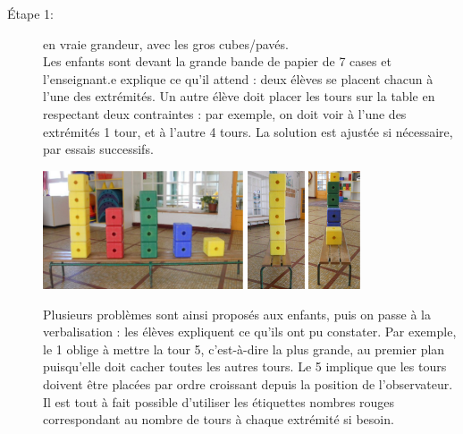 \begin{exercice*}
\begin{description}
   \item[Étape 1:] en vraie grandeur, avec les gros cubes/pavés. \\
   Les enfants sont devant la grande bande de papier de 7 cases et l’enseignant.e explique ce qu’il attend : deux élèves se placent chacun à l'une des extrémités. Un autre élève doit placer les tours sur la table en respectant deux contraintes : par exemple, on doit voir à l'une des extrémités 1 tour, et à l'autre 4 tours. La solution est ajustée si nécessaire, par essais successifs. \smallskip
   \begin{center}
      \includegraphics[height=3.5cm]{Geometrie_did/Images/Geo6_activites_tours3} \qquad \includegraphics[height=3.5cm]{Geometrie_did/Images/Geo6_activites_tours5} \qquad \includegraphics[height=3.5cm]{Geometrie_did/Images/Geo6_activites_tours4}
   \end{center}
   Plusieurs problèmes sont ainsi proposés aux enfants, puis on passe à la verbalisation : les élèves expliquent ce qu'ils ont pu constater. Par exemple, le 1 oblige à mettre la tour 5, c’est-à-dire la plus grande, au premier plan puisqu'elle doit cacher toutes les autres tours. Le 5 implique que les tours doivent être placées par ordre croissant depuis la position de l’observateur. Il est tout à fait possible d'utiliser les étiquettes nombres rouges correspondant au nombre de tours à chaque extrémité si besoin. \\

\end{description}
\end{exercice*}
